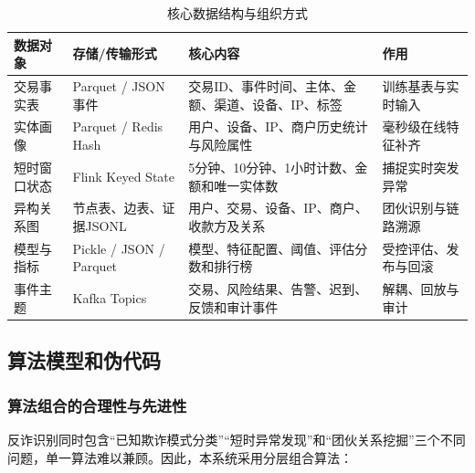 \begin{table}[H]
  \centering
  \caption{核心数据结构与组织方式}
  \label{tab:data_structure_design}
  \renewcommand\arraystretch{1.32}
  \setlength{\tabcolsep}{4pt}
  {\songti{}
  \begin{tabularx}{0.97\textwidth}{>{\raggedright\arraybackslash}p{2.4cm}>{\raggedright\arraybackslash}p{2.5cm}>{\raggedright\arraybackslash}X>{\raggedright\arraybackslash}p{3.1cm}}
    \toprule
    数据对象 & 存储/传输形式 & 核心内容 & 作用 \\
    \midrule
    交易事实表 & Parquet / JSON事件 & 交易ID、事件时间、主体、金额、渠道、设备、IP、标签 & 训练基表与实时输入 \\
    实体画像 & Parquet / Redis Hash & 用户、设备、IP、商户历史统计与风险属性 & 毫秒级在线特征补齐 \\
    短时窗口状态 & Flink Keyed State & 5分钟、10分钟、1小时计数、金额和唯一实体数 & 捕捉实时突发异常 \\
    异构关系图 & 节点表、边表、证据JSONL & 用户、交易、设备、IP、商户、收款方及关系 & 团伙识别与链路溯源 \\
    模型与指标 & Pickle / JSON / Parquet & 模型、特征配置、阈值、评估分数和排行榜 & 受控评估、发布与回滚 \\
    事件主题 & Kafka Topics & 交易、风险结果、告警、迟到、反馈和审计事件 & 解耦、回放与审计 \\
    \bottomrule
  \end{tabularx}}
\end{table}

\subsection{算法模型和伪代码}

\subsubsection{算法组合的合理性与先进性}

反诈识别同时包含“已知欺诈模式分类”“短时异常发现”和“团伙关系挖掘”三个不同问题，单一算法难以兼顾。因此，本系统采用分层组合算法：

